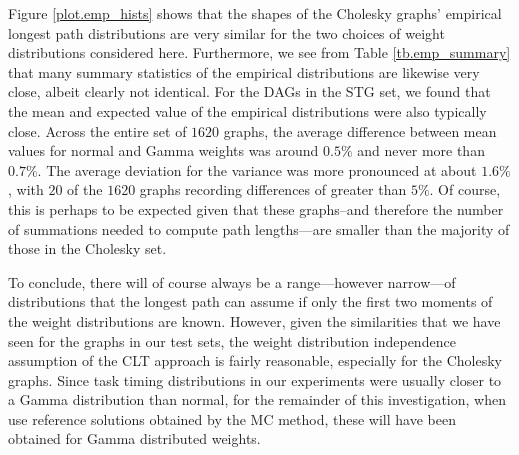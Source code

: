 \documentclass[12pt]{article}
\begin{document}
      Figure \ref{plot.emp_hists} shows that the shapes of the Cholesky graphs' empirical longest path distributions are very similar for the two choices of weight distributions considered here. Furthermore, we see from Table \ref{tb.emp_summary} that many summary statistics of the empirical distributions are likewise very close, albeit clearly not identical. For the DAGs in the STG set, we found that the mean and expected value of the empirical distributions were also typically close. Across the entire set of $1620$ graphs, the average difference between mean values for normal and Gamma weights was around $0.5\%$ and never more than $0.7\%$. The average deviation for the variance was more pronounced at about $1.6\%$, with $20$ of the $1620$ graphs recording differences of greater than $5\%$. Of course, this is perhaps to be expected given that these graphs--and therefore the number of summations needed to compute path lengths---are smaller than the majority of those in the Cholesky set.

      To conclude, there will of course always be a range---however narrow---of distributions that the longest path can assume if only the first two moments of the weight distributions are known. However, given the similarities that we have seen for the graphs in our test sets, the weight distribution independence assumption of the CLT approach is fairly reasonable, especially for the Cholesky graphs. Since task timing distributions in our experiments were usually closer to a Gamma distribution than normal, for the remainder of this investigation, when use reference solutions obtained by the MC method, these will have been obtained for Gamma distributed weights. 


\end{document}
